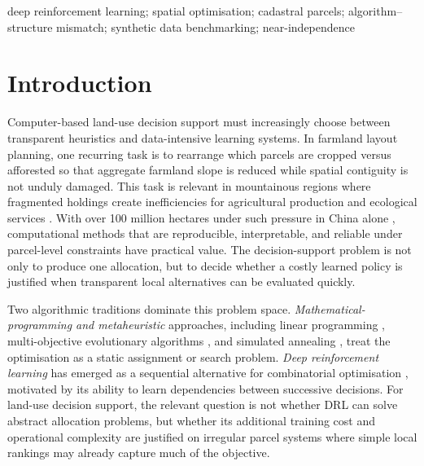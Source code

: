 \documentclass[]{interact}
\theoremstyle{plain}
\begin{document}
\begin{keywords}
deep reinforcement learning; spatial optimisation; cadastral parcels; algorithm--structure mismatch; synthetic data benchmarking; near-independence
\end{keywords}

\section{Introduction}\label{sec:intro}

Computer-based land-use decision support must increasingly choose between transparent heuristics and data-intensive learning systems. In farmland layout planning, one recurring task is to rearrange which parcels are cropped versus afforested so that aggregate farmland slope is reduced while spatial contiguity is not unduly damaged. This task is relevant in mountainous regions where fragmented holdings create inefficiencies for agricultural production and ecological services \citep{liu2014land,long2018land}. With over 100 million hectares under such pressure in China alone \citep{wu2005consolidation,tan2006fragmentation}, computational methods that are reproducible, interpretable, and reliable under parcel-level constraints have practical value. The decision-support problem is not only to produce one allocation, but to decide whether a costly learned policy is justified when transparent local alternatives can be evaluated quickly.

Two algorithmic traditions dominate this problem space. \emph{Mathematical-programming and metaheuristic} approaches, including linear programming \citep{aerts2003using}, multi-objective evolutionary algorithms \citep{deb2002fast,stewart2004multiobjective,cao2011sustainable}, and simulated annealing \citep{cao2012spatial}, treat the optimisation as a static assignment or search problem. \emph{Deep reinforcement learning} has emerged as a sequential alternative for combinatorial optimisation \citep{bello2017neural,nazari2018reinforcement,kool2019attention,zheng2023spatial}, motivated by its ability to learn dependencies between successive decisions. For land-use decision support, the relevant question is not whether DRL can solve abstract allocation problems, but whether its additional training cost and operational complexity are justified on irregular parcel systems where simple local rankings may already capture much of the objective.
\end{document}
